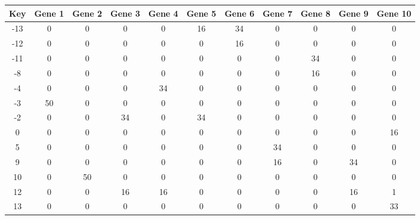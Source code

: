 \begin{tabular}{|c|c|c|c|c|c|c|c|c|c|c|}
\hline
Key & Gene 1 & Gene 2 & Gene 3 & Gene 4 & Gene 5 & Gene 6 & Gene 7 & Gene 8 & Gene 9 & Gene 10 \\
\hline
-13 & 0 & 0 & 0 & 0 & 16 & 34 & 0 & 0 & 0 & 0 \\
-12 & 0 & 0 & 0 & 0 & 0 & 16 & 0 & 0 & 0 & 0 \\
-11 & 0 & 0 & 0 & 0 & 0 & 0 & 0 & 34 & 0 & 0 \\
-8 & 0 & 0 & 0 & 0 & 0 & 0 & 0 & 16 & 0 & 0 \\
-4 & 0 & 0 & 0 & 34 & 0 & 0 & 0 & 0 & 0 & 0 \\
-3 & 50 & 0 & 0 & 0 & 0 & 0 & 0 & 0 & 0 & 0 \\
-2 & 0 & 0 & 34 & 0 & 34 & 0 & 0 & 0 & 0 & 0 \\
0 & 0 & 0 & 0 & 0 & 0 & 0 & 0 & 0 & 0 & 16 \\
5 & 0 & 0 & 0 & 0 & 0 & 0 & 34 & 0 & 0 & 0 \\
9 & 0 & 0 & 0 & 0 & 0 & 0 & 16 & 0 & 34 & 0 \\
10 & 0 & 50 & 0 & 0 & 0 & 0 & 0 & 0 & 0 & 0 \\
12 & 0 & 0 & 16 & 16 & 0 & 0 & 0 & 0 & 16 & 1 \\
13 & 0 & 0 & 0 & 0 & 0 & 0 & 0 & 0 & 0 & 33 \\
\hline
\end{tabular}